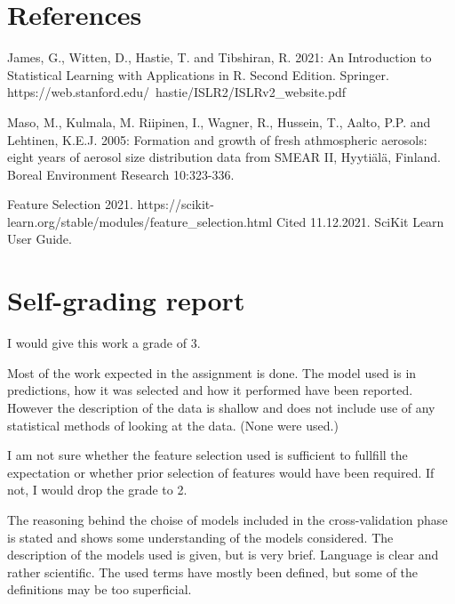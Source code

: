 \documentclass[a4size, 12pt]{report}
\begin{document}


	

	     

\section*{References}

James, G., Witten, D., Hastie, T. and Tibshiran, R. 2021: An Introduction to Statistical Learning with Applications in R. Second Edition. Springer. https://web.stanford.edu/~hastie/ISLR2/ISLRv2\_website.pdf  

Maso, M., Kulmala, M. Riipinen, I., Wagner, R., Hussein, T., Aalto, P.P. and Lehtinen, K.E.J. 2005: Formation and growth of fresh athmospheric aerosols: eight years of aerosol size distribution data from SMEAR II, Hyytiälä, Finland. Boreal Environment Research 10:323-336. 

Feature Selection 2021. https://scikit-learn.org/stable/modules/feature\_selection.html  Cited 11.12.2021. SciKit Learn User Guide. 

\pagebreak
\section* {Self-grading report} 

I would give this work a grade of 3.

Most of the work expected in the assignment is done. The model used is in predictions, how it was selected and how it performed have been reported. However the description of the data is shallow and does not include use of any statistical methods of looking at the data. (None were used.)

I am not sure whether the feature selection used is sufficient to fullfill the expectation or whether prior selection of features would have been required. If not, I would drop the grade to 2. 

The reasoning behind the choise of models included in the cross-validation phase is stated and shows some understanding of the models considered. The description of the models used is given, but is very brief. Language is clear and rather scientific. The used terms have mostly been defined, but some of the definitions may be too superficial.      
\end{document}

